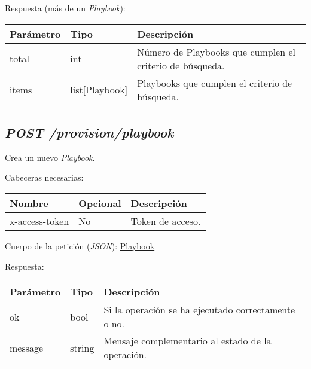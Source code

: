 		Respuesta (más de un \textit{Playbook}):
		\begin{table}[h!]
			\centering
	\begin{adjustbox}{max width=\textwidth}
			\begin{tabularx}{\linewidth}{|l|l|L|}
				\hline
				Parámetro & Tipo & Descripción \\ \hline
				total & int & Número de Playbooks que cumplen el criterio de búsqueda. \\ \hline
				items & list[\hyperref[sec:playbook]{Playbook}] & Playbooks que cumplen el criterio de búsqueda. \\ \hline
			\end{tabularx}
\end{adjustbox}
		\end{table}
	
	
	
	\subsection{\textit{POST /provision/playbook}}
		Crea un nuevo \textit{Playbook}.
		
		Cabeceras necesarias:
		\begin{table}[h!]
			\centering
	\begin{adjustbox}{max width=\textwidth}
			\begin{tabular}{|l|l|l|}
				\hline
				Nombre & Opcional & Descripción \\ \hline
				x-access-token & No & Token de acceso. \\ \hline
			\end{tabular}
\end{adjustbox}
		\end{table}
		
		Cuerpo de la petición (\textit{JSON}): \hyperref[sec:playbook]{Playbook}
		
		\pagebreak
		Respuesta:
		\begin{table}[h!]
			\centering
	\begin{adjustbox}{max width=\textwidth}
			\begin{tabular}{|l|l|l|}
				\hline
				Parámetro & Tipo & Descripción \\ \hline
				ok & bool & Si la operación se ha ejecutado correctamente o no. \\ \hline
				message & string & Mensaje complementario al estado de la operación. \\ \hline
			\end{tabular}
\end{adjustbox}
	\end{table}
	
